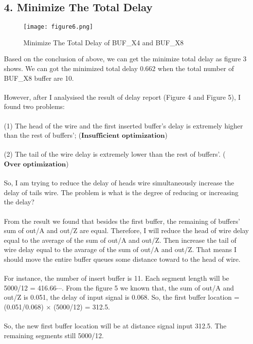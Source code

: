 \documentclass[a4paper,11pt]{article}
\begin{document}
\begin{flushleft}
\newpage
\subsection*{4. Minimize The Total Delay}
\begin{figure}[ht]
\centering
\texttt{[image: figure6.png]}
\caption{Minimize The Total Delay of BUF\_X4 and BUF\_X8}
\label{fig:label}
\end{figure}
Based on the conclusion of above, we can get the minimize total delay as figure 3 shows. We can got the minimized total delay 0.662 when the total number of BUF\_X8 buffer are 10.\\
\hspace*{\fill} \\
However, after I analysised the result of delay report (Figure 4 and Figure 5), I found two problems:\\
\hspace*{\fill} \\
(1) The head of the wire and the first inserted buffer's delay is extremely higher than the rest of \hspace*{0.55cm}buffers'; ($\textbf{Insufficient optimization}$)\\
\hspace*{\fill} \\
(2) The tail of the wire delay is extremely lower than the rest of buffers'. ($\textbf{Over optimization}$)\\
\hspace*{\fill} \\
So, I am trying to reduce the delay of heads wire simultaneously increase the delay of tails wire. The problem is what is the degree of reducing or increasing the delay?\\
\hspace*{\fill} \\
From the result we found that besides the first buffer, the remaining of buffers' sum of out/A and out/Z are equal. Therefore, I will reduce the head of wire delay equal to the average of the sum of out/A and out/Z. Then increase the tail of wire delay equal to the avarage of the sum of out/A and out/Z. That means I should move the entire buffer queues some distance toward to the head of wire.\\
\hspace*{\fill} \\
For instance, the number of insert buffer is 11. Each segment length will be 5000/12 = 416.66$\cdots$. From the figure 5 we known that, the sum of out/A and out/Z is 0.051, the delay of input signal is 0.068. So, the first buffer location = (0.051/0.068) $\times$ (5000/12) = 312.5.\\
\hspace*{\fill} \\
So, the new first buffer location will be at distance signal input 312.5. The remaining segments still 5000/12.\\
\hspace*{\fill} \\


\end{flushleft}
\end{document}
